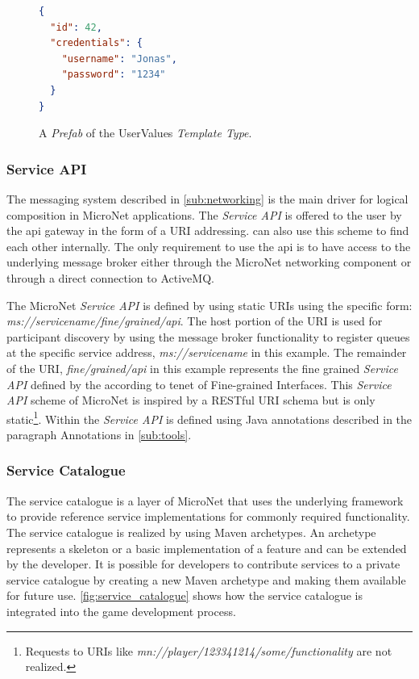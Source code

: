 \begin{figure}
\begin{lstlisting}[language=json,firstnumber=1] 
{
  "id": 42,
  "credentials": {
    "username": "Jonas",
    "password": "1234"
  }
}
\end{lstlisting}
\caption{A \textit{Prefab} of the UserValues \textit{Template Type}.}
\label{lst:prefab_type}
\end{figure}



\subsubsection{Service API}

The messaging system described in \autoref{sub:networking} is the main driver
for logical composition in MicroNet applications. The \textit{Service API} is
offered to the user by the \gls{api} gateway in the form of a URI addressing. \mss{}
can also use this scheme to find each other internally. The only requirement to
use the \gls{api} is to have access to the underlying message broker either
through the MicroNet networking component or through a direct connection to
ActiveMQ.

The MicroNet \textit{Service API} is defined by using static URIs using the
specific form: \textit{ms://servicename/fine/grained/api}. The host portion of
the URI is used for participant discovery by using the message broker
functionality to register queues at the specific service address,
\textit{ms://servicename} in this example. The remainder of the URI,
\textit{fine/grained/api} in this example represents the fine grained
\textit{Service API} defined by the \ms{} according to tenet of Fine-grained
Interfaces. This \textit{Service API} scheme of MicroNet is inspired by a
RESTful URI schema but is only static\footnote{Requests to URIs like
\textit{mn://player/123341214/some/functionality} are not realized.}. Within
\mss{} the \textit{Service API} is defined using Java annotations described in
the paragraph Annotations in \autoref{sub:tools}.

\subsubsection{Service Catalogue}

The service catalogue is a layer of MicroNet that uses the underlying framework
to provide reference service implementations for commonly required
functionality. The service catalogue is realized by using Maven archetypes. An
archetype represents a skeleton or a basic implementation of a feature and can
be extended by the developer. It is possible for developers to contribute
services to a private service catalogue by creating a new Maven archetype and
making them available for future use. \autoref{fig:service_catalogue} shows
how the service catalogue is integrated into the game development process.

